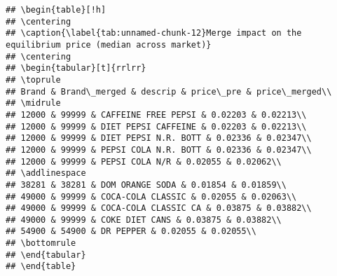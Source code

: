 \documentclass[
]{article}
\begin{document}
\begin{verbatim}
## \begin{table}[!h]
## \centering
## \caption{\label{tab:unnamed-chunk-12}Merge impact on the equilibrium price (median across market)}
## \centering
## \begin{tabular}[t]{rrlrr}
## \toprule
## Brand & Brand\_merged & descrip & price\_pre & price\_merged\\
## \midrule
## 12000 & 99999 & CAFFEINE FREE PEPSI & 0.02203 & 0.02213\\
## 12000 & 99999 & DIET PEPSI CAFFEINE & 0.02203 & 0.02213\\
## 12000 & 99999 & DIET PEPSI N.R. BOTT & 0.02336 & 0.02347\\
## 12000 & 99999 & PEPSI COLA N.R. BOTT & 0.02336 & 0.02347\\
## 12000 & 99999 & PEPSI COLA N/R & 0.02055 & 0.02062\\
## \addlinespace
## 38281 & 38281 & DOM ORANGE SODA & 0.01854 & 0.01859\\
## 49000 & 99999 & COCA-COLA CLASSIC & 0.02055 & 0.02063\\
## 49000 & 99999 & COCA-COLA CLASSIC CA & 0.03875 & 0.03882\\
## 49000 & 99999 & COKE DIET CANS & 0.03875 & 0.03882\\
## 54900 & 54900 & DR PEPPER & 0.02055 & 0.02055\\
## \bottomrule
## \end{tabular}
## \end{table}
\end{verbatim}
\end{document}

